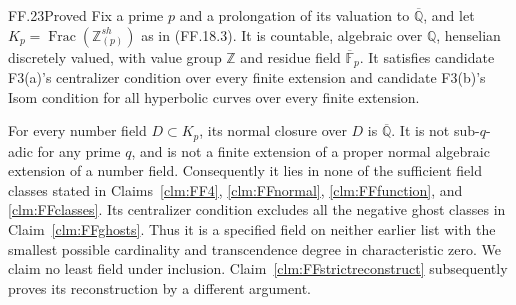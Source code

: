 \begin{claim}{FF.23}{Proved}\label{clm:FFstricttest}
Fix a prime \(p\) and a prolongation of its valuation to
\(\overline{\mathbb Q}\), and let
\(K_p=\operatorname{Frac}(\mathbb Z_{(p)}^{sh})\) as
in (FF.18.3). It is countable, algebraic over \(\mathbb Q\),
henselian discretely valued, with value group \(\mathbb Z\)
and residue field \(\overline{\mathbb F}_p\).
It satisfies candidate F3(a)'s centralizer condition over
every finite extension and candidate F3(b)'s Isom condition
for all hyperbolic curves over every finite extension.

For every number field \(D\subset K_p\), its normal
closure over \(D\) is \(\overline{\mathbb Q}\).
It is not sub-\(q\)-adic for any prime \(q\), and is
not a finite extension of a proper normal algebraic extension
of a number field. Consequently it lies in none of the
sufficient field classes stated in Claims~\ref{clm:FF4},
\ref{clm:FFnormal}, \ref{clm:FFfunction}, and
\ref{clm:FFclasses}. Its centralizer condition excludes
all the negative ghost classes in
Claim~\ref{clm:FFghosts}.
Thus it is a specified field on neither earlier list with the
smallest possible cardinality and transcendence degree
in characteristic zero. We claim no least field under
inclusion. Claim~\ref{clm:FFstrictreconstruct} subsequently
proves its reconstruction by a different argument.
\end{claim}
